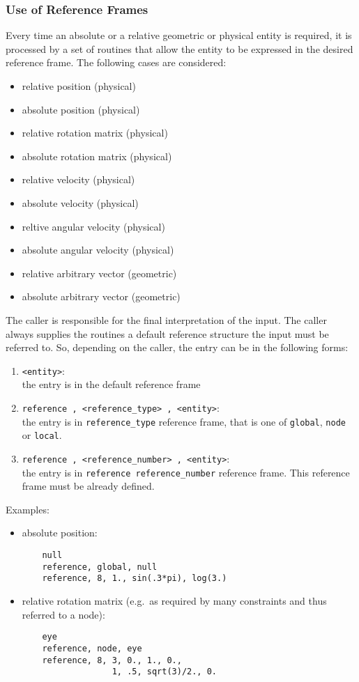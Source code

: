 \subsubsection{Use of Reference Frames}
Every time an absolute or a relative geometric or physical entity is
required, it is processed by a set of routines that allow the entity to be
expressed in the desired reference frame.
The following cases are considered:
\begin{itemize}
    \item relative position (physical)
    \item absolute position (physical)
    \item relative rotation matrix (physical)
    \item absolute rotation matrix (physical)
    \item relative velocity (physical)
    \item absolute velocity (physical)
    \item reltive angular velocity (physical)
    \item absolute angular velocity (physical)
    \item relative arbitrary vector (geometric)
    \item absolute arbitrary vector (geometric)    
\end{itemize}
The caller is responsible for the final interpretation of the input. 
The caller always supplies the routines a default reference structure
the input must be referred to.
So, depending on the caller, the entry can be in the following forms:
\begin{enumerate}
    \item \texttt{<entity>}: \\ 
    the entry is in the default reference frame
    \item \texttt{reference , <reference\_type> , <entity>}: \\
    the entry is in \texttt{reference\_type} reference frame, 
    that is one of \texttt{global}, 
    \texttt{node} or \texttt{local}.
    \item \texttt{reference , <reference\_number> , <entity>}: \\
    the entry is in \texttt{reference reference\_number} reference frame. 
    This reference frame must be already defined. 
\end{enumerate}
Examples:
\begin{itemize}
    \item absolute position:
    \begin{verbatim}
    null
    reference, global, null
    reference, 8, 1., sin(.3*pi), log(3.)
    \end{verbatim}
    \item relative rotation matrix (e.g.\ as required by many constraints and
    thus referred to a node):
    \begin{verbatim}
    eye
    reference, node, eye
    reference, 8, 3, 0., 1., 0., 
                  1, .5, sqrt(3)/2., 0.
    \end{verbatim}
\end{itemize}
